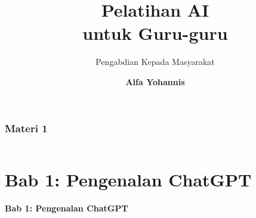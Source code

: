 \documentclass[aspectratio=169, table]{beamer}
\title{\Huge Pelatihan AI\\\vspace{10pt}untuk Guru-guru}
\subtitle{Pengabdian Kepada Masyarakat}
\author{\textbf{Alfa Yohannis}}
\begin{document}
	
	\frame{\titlepage}
	
	
	\begin{frame}[fragile]
		\frametitle{Materi 1}
		\vspace{20pt}
		\begin{columns}[t]
			\tableofcontents[sections={1-3}]
			
			\tableofcontents[sections={4-6}]
		\end{columns}
	\end{frame}


\section{Bab 1: Pengenalan ChatGPT}
\begin{frame}{\hfill}
	\centering
	\Huge{\textbf{Bab 1: Pengenalan ChatGPT}}
\end{frame}
	
\end{document}
